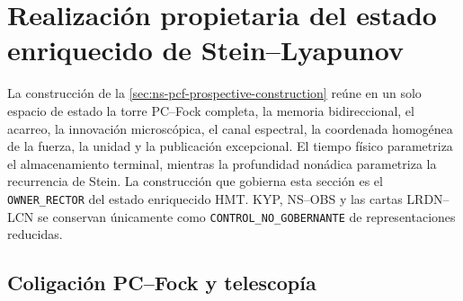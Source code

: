 \section{Realización propietaria del estado enriquecido de Stein--Lyapunov}
\label{sec:ns-owner-closure}

La construcción de la \cref{sec:ns-pcf-prospective-construction} reúne en un
solo espacio de estado la torre PC--Fock completa, la memoria bidireccional,
el acarreo, la innovación microscópica, el canal espectral, la coordenada
homogénea de la fuerza, la unidad y la publicación excepcional. El tiempo
físico parametriza el almacenamiento terminal, mientras la profundidad
nonádica parametriza la recurrencia de Stein. La construcción que gobierna
esta sección es el \texttt{OWNER\_RECTOR} del estado enriquecido HMT. KYP,
NS--OBS y las cartas LRDN--LCN se conservan únicamente como
\texttt{CONTROL\_NO\_GOBERNANTE} de representaciones reducidas.

\subsection{Coligación PC--Fock y telescopía}

